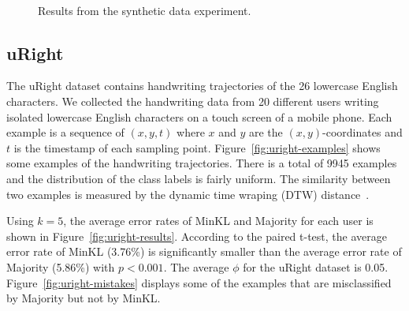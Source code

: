 \documentclass{article}
\begin{document}
\begin{figure}[tb]
\begin{center}
{  \label{fig:synthetic-2}
}\\
\caption{Results from the synthetic data experiment.}
\label{fig:synthetic}
\end{center}
\vskip -0.2in
\end{figure}

\subsection{uRight}
The uRight dataset contains handwriting trajectories of the 26
lowercase English characters.  We collected the handwriting data from
20 different users writing isolated lowercase English characters on a
touch screen of a mobile phone. Each example is a sequence of
$(x,y,t)$ where $x$ and $y$ are the $(x,y)$-coordinates and $t$ is the
timestamp of each sampling point. Figure~\ref{fig:uright-examples} shows some
examples of the handwriting trajectories. There is a total of 9945
examples and the distribution of the class labels is fairly uniform. The
similarity between two examples is measured by the dynamic time
wraping (DTW) distance~\cite{Bahlmann2004}.

Using $k = 5$, the average error rates of MinKL and Majority for each
user is shown in Figure~\ref{fig:uright-results}. According to the paired
t-test, the average error rate of MinKL (3.76\%) is significantly
smaller than the average error rate of Majority (5.86\%) with $p <
0.001$. The average $\phi$ for the uRight dataset is
0.05. Figure~\ref{fig:uright-mistakes} displays some of the examples that are
misclassified by Majority but not by MinKL.
\end{document}
